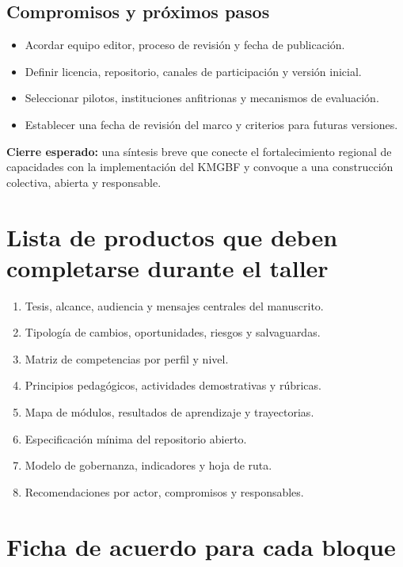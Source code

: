 \documentclass[11pt,a4paper]{article}
\begin{document}
\subsection{Compromisos y próximos pasos}

\begin{itemize}
  \item Acordar equipo editor, proceso de revisión y fecha de publicación.
  \item Definir licencia, repositorio, canales de participación y versión inicial.
  \item Seleccionar pilotos, instituciones anfitrionas y mecanismos de evaluación.
  \item Establecer una fecha de revisión del marco y criterios para futuras
  versiones.
\end{itemize}

\noindent\textbf{Cierre esperado:}
una síntesis breve que conecte el fortalecimiento regional de capacidades con la
implementación del KMGBF y convoque a una construcción colectiva, abierta y
responsable.




\appendix

\section{Lista de productos que deben completarse durante el taller}

\begin{enumerate}
  \item Tesis, alcance, audiencia y mensajes centrales del manuscrito.
  \item Tipología de cambios, oportunidades, riesgos y salvaguardas.
  \item Matriz de competencias por perfil y nivel.
  \item Principios pedagógicos, actividades demostrativas y rúbricas.
  \item Mapa de módulos, resultados de aprendizaje y trayectorias.
  \item Especificación mínima del repositorio abierto.
  \item Modelo de gobernanza, indicadores y hoja de ruta.
  \item Recomendaciones por actor, compromisos y responsables.
\end{enumerate}

\section{Ficha de acuerdo para cada bloque}
\end{document}
